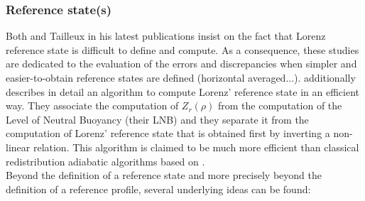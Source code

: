 \color{black}
\subsubsection{Reference state(s)}
Both \cite{saenz_estimating_2015} and Tailleux in his latest publications \citep{tailleux_local_2018} insist on the fact that Lorenz reference state is difficult to define and compute. As a consequence, these studies are dedicated to the evaluation of the errors and discrepancies when simpler and easier-to-obtain reference states are defined (horizontal averaged...). \cite{saenz_estimating_2015} additionally describes in detail an algorithm to compute Lorenz' reference state in an efficient way. They associate the computation of $Z_r(\rho)$ from the computation of the Level of Neutral Buoyancy (their LNB) and they separate it from the computation of Lorenz' reference state that is obtained first by inverting a non-linear relation. This algorithm is claimed to be much more efficient than classical redistribution adiabatic algorithms based on \citep{winters_available_1995}.\\
Beyond the definition of a reference state and more precisely beyond the definition of a reference profile, several underlying ideas can be found:\\
